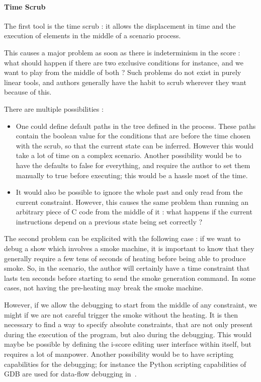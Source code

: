 \documentclass{sigchi}
\begin{document}
\paragraph{Time Scrub}
The first tool is the time scrub : it allows the displacement in time and the execution of elements in the middle of a scenario process. 

This causes a major problem as soon as there is indeterminism in the score : what should happen if there are two exclusive conditions for instance, and we want to play from the middle of both ? Such problems do not exist in purely linear tools, and authors generally have the habit to scrub wherever they want because of this.

There are multiple possibilities : 

\begin{itemize}
    \item One could define default paths in the tree defined in the process. These paths contain the boolean value for the conditions that are before the time chosen with the scrub, so that the current state can be inferred. However this would take a lot of time on a complex scenario.
    Another possibility would be to have the defaults to false for everything, and require the author to set them manually to true before executing; this would be a hassle most of the time.
    \item It would also be possible to ignore the whole past and only read from the current constraint. However, this causes the same problem than running an arbitrary piece of C code from the middle of it : what happens if the current instructions depend on a previous state being set correctly ?
\end{itemize}

The second problem can be explicited with the following case : if we want to debug a show which involves a smoke machine, it is important to know that they generally require a few tens of seconds of heating before being able to produce smoke. So, in the scenario, the author will certainly have a time constraint that lasts ten seconds before starting to send the smoke generation command. In some cases, not having the pre-heating may break the smoke machine.

However, if we allow the debugging to start from the middle of any constraint, we might if we are not careful trigger the smoke without the heating. It is then necessary to find a way to specify absolute constraints, that are not only present during the execution of the program, but also during the debugging. This would maybe be possible by defining the i-score editing user interface within itself, but requires a lot of manpower. Another possibility would be to have scripting capabilities for the debugging; for instance the Python scripting capabilities of GDB are used for data-flow debugging in~\cite{pouget2013interactive}.
\end{document}
